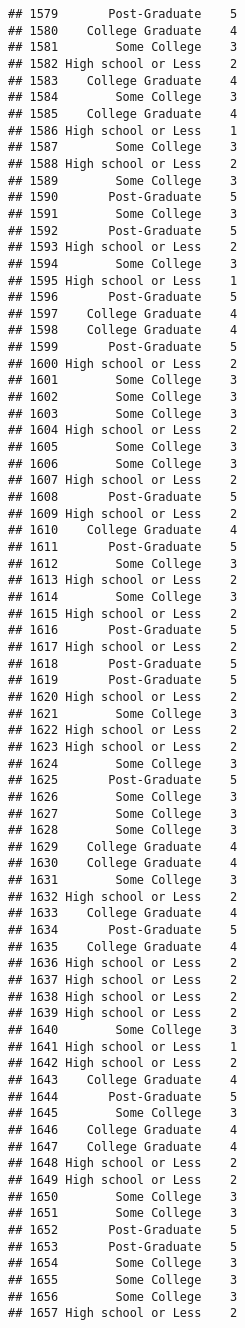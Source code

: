 \documentclass[
]{article}
\begin{document}
\begin{verbatim}
## 1579       Post-Graduate    5
## 1580    College Graduate    4
## 1581        Some College    3
## 1582 High school or Less    2
## 1583    College Graduate    4
## 1584        Some College    3
## 1585    College Graduate    4
## 1586 High school or Less    1
## 1587        Some College    3
## 1588 High school or Less    2
## 1589        Some College    3
## 1590       Post-Graduate    5
## 1591        Some College    3
## 1592       Post-Graduate    5
## 1593 High school or Less    2
## 1594        Some College    3
## 1595 High school or Less    1
## 1596       Post-Graduate    5
## 1597    College Graduate    4
## 1598    College Graduate    4
## 1599       Post-Graduate    5
## 1600 High school or Less    2
## 1601        Some College    3
## 1602        Some College    3
## 1603        Some College    3
## 1604 High school or Less    2
## 1605        Some College    3
## 1606        Some College    3
## 1607 High school or Less    2
## 1608       Post-Graduate    5
## 1609 High school or Less    2
## 1610    College Graduate    4
## 1611       Post-Graduate    5
## 1612        Some College    3
## 1613 High school or Less    2
## 1614        Some College    3
## 1615 High school or Less    2
## 1616       Post-Graduate    5
## 1617 High school or Less    2
## 1618       Post-Graduate    5
## 1619       Post-Graduate    5
## 1620 High school or Less    2
## 1621        Some College    3
## 1622 High school or Less    2
## 1623 High school or Less    2
## 1624        Some College    3
## 1625       Post-Graduate    5
## 1626        Some College    3
## 1627        Some College    3
## 1628        Some College    3
## 1629    College Graduate    4
## 1630    College Graduate    4
## 1631        Some College    3
## 1632 High school or Less    2
## 1633    College Graduate    4
## 1634       Post-Graduate    5
## 1635    College Graduate    4
## 1636 High school or Less    2
## 1637 High school or Less    2
## 1638 High school or Less    2
## 1639 High school or Less    2
## 1640        Some College    3
## 1641 High school or Less    1
## 1642 High school or Less    2
## 1643    College Graduate    4
## 1644       Post-Graduate    5
## 1645        Some College    3
## 1646    College Graduate    4
## 1647    College Graduate    4
## 1648 High school or Less    2
## 1649 High school or Less    2
## 1650        Some College    3
## 1651        Some College    3
## 1652       Post-Graduate    5
## 1653       Post-Graduate    5
## 1654        Some College    3
## 1655        Some College    3
## 1656        Some College    3
## 1657 High school or Less    2

\end{verbatim}
\end{document}
